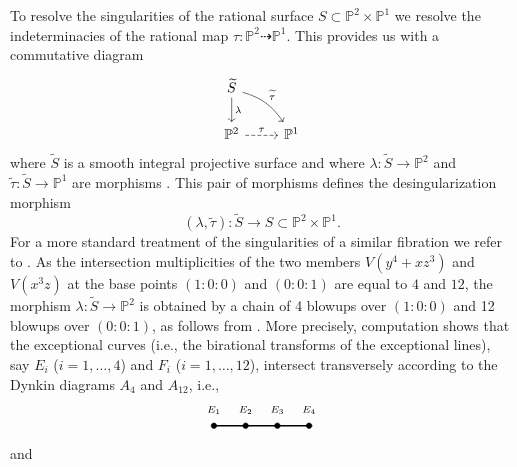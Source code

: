 \documentclass[12pt,reqno]{amsart}
\theoremstyle{definition}
\newcommand{\ttto}{\dashrightarrow} %
\newcommand{\tto}{\longrightarrow}
\newcommand{\wt}{\widetilde}
\newcommand{\PP}{\mathbb{P}}
\newcommand{\lam}{\lambda}
\begin{document}
To resolve the singularities of the rational surface $S\subset \PP^2 \times \PP^1$ we resolve the indeterminacies of the rational map $\tau:\PP^2 \ttto \PP^1$. 
This provides us with a commutative diagram
\[ 
\begin{tikzcd}
    \wt S \ar[d,"\lam"]\ar[dr,"\wt \tau", bend left = 20] \\
    \PP^2 \ar[r,dashed,"\tau"] & \PP^1 
\end{tikzcd} 
\]
where $\wt S$ is a smooth integral projective surface and where $\lam: \wt S \to \PP^2$ and $\wt \tau: \wt S \to \PP^1$ are morphisms \cite[p.\,263, Theorem~4.8]{Shaf13a}.
This pair of morphisms defines the desingularization morphism
\[ (\lam,\wt \tau): \wt S \tto S \subset \PP^2 \times \PP^1. \]
For a more standard treatment of the singularities of a similar fibration we refer to \cite[Section 6]{HiSt23}.
As the intersection multiplicities of the two members $V(y^4 + xz^3)$ and $V(x^3 z)$ at the base points $(1:0:0)$ and $(0:0:1)$ are equal to $4$ and $12$, the morphism $\lam: \wt S \to \PP^2$ is obtained by a chain of 4 blowups over $(1:0:0)$ and 12 blowups over $(0:0:1)$, as follows from \cite[p.\,262, Corollary~4.3]{Shaf13a}.
More precisely, computation shows that the exceptional curves (i.e., the birational transforms of the exceptional lines), say $E_i$ ($i=1,\dots,4$) and $F_i$ ($i=1,\dots,12$), intersect transversely according to the Dynkin diagrams $A_4$ and $A_{12}$, i.e.,
\[
\centering
\begin{tikzpicture}[line cap=round,line join=round,x=0.8cm,y=0.8cm]
\draw [line width=1.2pt] (-7.,0.)-- (-4.,0.);
\begin{scriptsize}
\draw [fill=black] (-7,0) circle (2pt);
\draw[color=black] (-7,0.5) node {$E_{1}$};    
\draw [fill=black] (-6,0) circle (2pt);
\draw[color=black] (-6,0.5) node {$E_{2}$};
\draw [fill=black] (-5,0) circle (2pt);
\draw[color=black] (-5,0.5) node {$E_3$};
\draw [fill=black] (-4,0) circle (2pt);
\draw[color=black] (-4,0.5) node {$E_4$};
\end{scriptsize}
\end{tikzpicture}
\]
and
\end{document}
